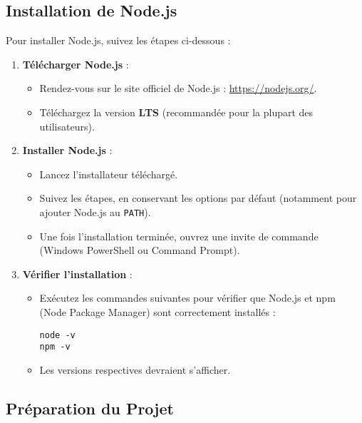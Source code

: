 \documentclass[a4paper,12pt]{article}
\begin{document}
\subsection{Installation de Node.js}

Pour installer Node.js, suivez les étapes ci-dessous :

\begin{enumerate}
    \item \textbf{Télécharger Node.js} :
    \begin{itemize}
        \item Rendez-vous sur le site officiel de Node.js : \url{https://nodejs.org/}.
        \item Téléchargez la version \textbf{LTS} (recommandée pour la plupart des utilisateurs).
    \end{itemize}

    \item \textbf{Installer Node.js} :
    \begin{itemize}
        \item Lancez l'installateur téléchargé.
        \item Suivez les étapes, en conservant les options par défaut (notamment pour ajouter Node.js au \texttt{PATH}).
        \item Une fois l'installation terminée, ouvrez une invite de commande (Windows PowerShell ou Command Prompt).
    \end{itemize}

    \item \textbf{Vérifier l'installation} :
    \begin{itemize}
        \item Exécutez les commandes suivantes pour vérifier que Node.js et npm (Node Package Manager) sont correctement installés :
        \begin{verbatim}
node -v
npm -v
        \end{verbatim}
        \item Les versions respectives devraient s'afficher.
    \end{itemize}
\end{enumerate}

\subsection{Préparation du Projet}
\end{document}
